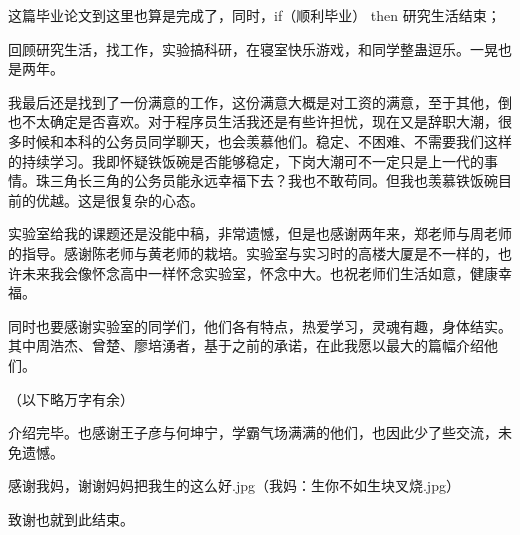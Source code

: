 
\begin{acknowledgements}

这篇毕业论文到这里也算是完成了，同时，if（顺利毕业） then 研究生活结束；

回顾研究生活，找工作，实验搞科研，在寝室快乐游戏，和同学整蛊逗乐。一晃也是两年。

我最后还是找到了一份满意的工作，这份满意大概是对工资的满意，至于其他，倒也不太确定是否喜欢。对于程序员生活我还是有些许担忧，现在又是辞职大潮，很多时候和本科的公务员同学聊天，也会羡慕他们。稳定、不困难、不需要我们这样的持续学习。我即怀疑铁饭碗是否能够稳定，下岗大潮可不一定只是上一代的事情。珠三角长三角的公务员能永远幸福下去？我也不敢苟同。但我也羡慕铁饭碗目前的优越。这是很复杂的心态。

实验室给我的课题还是没能中稿，非常遗憾，但是也感谢两年来，郑老师与周老师的指导。感谢陈老师与黄老师的栽培。实验室与实习时的高楼大厦是不一样的，也许未来我会像怀念高中一样怀念实验室，怀念中大。也祝老师们生活如意，健康幸福。

同时也要感谢实验室的同学们，他们各有特点，热爱学习，灵魂有趣，身体结实。其中周浩杰、曾楚、廖培湧者，基于之前的承诺，在此我愿以最大的篇幅介绍他们。

（以下略万字有余）

介绍完毕。也感谢王子彦与何坤宁，学霸气场满满的他们，也因此少了些交流，未免遗憾。

感谢我妈，谢谢妈妈把我生的这么好.jpg（我妈：生你不如生块叉烧.jpg）

致谢也就到此结束。

\end{acknowledgements}
